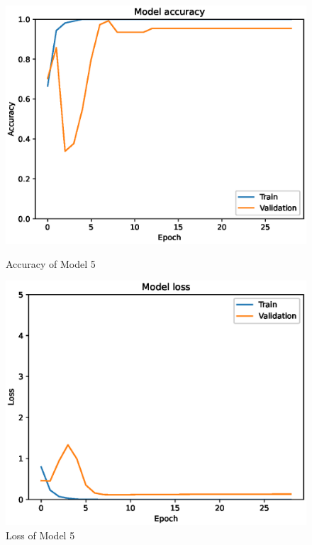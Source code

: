 \begin{figure}[H]
    \centering
    \begin{minipage}{0.45\textwidth}
        \centering
        \includegraphics[width=\textwidth]{./fig/fish_lung/accuracy5.eps}
        \caption{Accuracy of Model 5}
        \label{fig:model5_acc}
    \end{minipage}
    \begin{minipage}{0.45\textwidth}
        \centering
        \includegraphics[width=\textwidth]{./fig/fish_lung/loss5.eps}
        \caption{Loss of Model 5}
        \label{fig:model5_loss}
    \end{minipage}
\end{figure}

